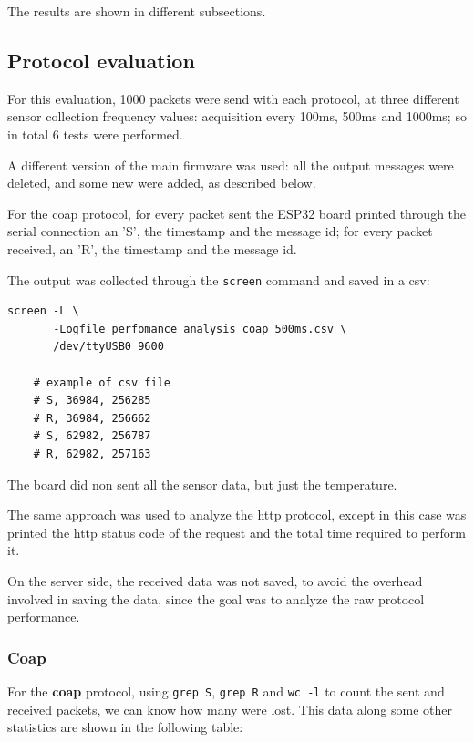 \documentclass[]{article}
\begin{document}
The results are shown in different subsections.

\subsection{Protocol evaluation}
For this evaluation, 1000 packets were send with each protocol, at three different sensor collection frequency values: acquisition every 100ms, 500ms and 1000ms; so in total 6 tests were performed. 

A different version of the main firmware was used: all the output messages were deleted, and some new were added, as described below.

For the coap protocol, for every packet sent the ESP32 board printed through the serial connection an 'S', the timestamp and the message id; for every packet received, an 'R', the timestamp and the message id. 

The output was collected through the \texttt{screen} command and saved in a csv:

\begin{lstlisting}[style=bash, caption=Command to capture the board serial output]
	screen -L \ 
	   -Logfile perfomance_analysis_coap_500ms.csv \
	   /dev/ttyUSB0 9600
	
	# example of csv file
 	# S, 36984, 256285
	# R, 36984, 256662
	# S, 62982, 256787
	# R, 62982, 257163
\end{lstlisting}

The board did non sent all the sensor data, but just the temperature.

The same approach was used to analyze the http protocol, except in this case was printed the http status code of the request and the total time required to perform it. 

On the server side, the received data was not saved, to avoid the overhead involved in saving the data, since the goal was to analyze the raw protocol performance. 

\subsubsection{Coap}
For the \textbf{coap} protocol, using \texttt{grep S}, \texttt{grep R} and \texttt{wc -l} to count the sent and received packets, we can know how many were lost. This data along some other statistics are shown in the following table:
\end{document}
